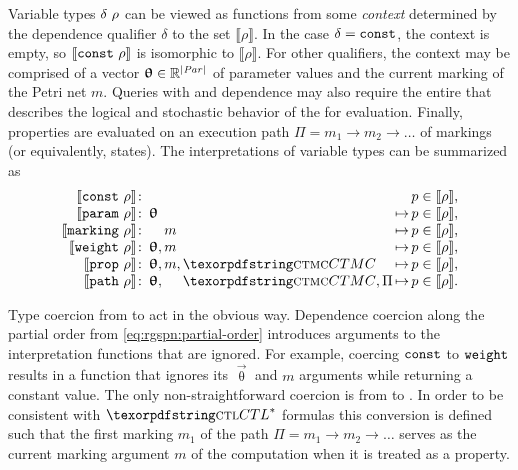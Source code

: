 Variable types \(\delta\ \rho\) can be viewed as functions from some \emph{context} determined by the dependence qualifier \(\delta\) to the set \(\llbracket \rho \rrbracket\). In the case \(\delta = \texttt{\upshape const}\), the context is empty, so \(\llbracket \texttt{\upshape const}\ \rho \rrbracket\) is isomorphic to \(\llbracket \rho \rrbracket\). For other qualifiers, the context may be comprised of a vector \(\bm{\mathrm{\uptheta}} \in \mathbb{R}^{\lvert \textrm{\itshape Par\/} \rvert}\) of parameter values and the current marking of the Petri net \(m\). Queries with  and  dependence may also require the entire  that describes the logical and stochastic behavior of the  for evaluation. Finally,  properties are evaluated on an execution path \(\Pi = m_1 \to m_2 \to \ldots\) of markings (or equivalently,  states). The interpretations of variable types can be summarized as
\begin{equation}
  \begin{array}{@{}r@{\,}l@{\,}l@{\,}l@{\,}l@{\,}l@{\,}c@{}}
    \llbracket \vartype{\lit{const}}{\rho} \rrbracket \colon& & & & & &p \in \llbracket \rho \rrbracket \text, \\
    \llbracket \vartype{\lit{param}}{\rho} \rrbracket \colon& \vec{\uptheta} & & & & \mapsto &p \in \llbracket \rho \rrbracket \text, \\
    \llbracket \vartype{\lit{marking}}{\rho} \rrbracket \colon& & m & & & \mapsto &p \in \llbracket \rho \rrbracket \text, \\
    \llbracket \vartype{\lit{weight}}{\rho} \rrbracket \colon& \vec{\uptheta}, & m & & & \mapsto &p \in \llbracket \rho \rrbracket \text, \\
    \llbracket \vartype{\lit{prop}}{\rho} \rrbracket \colon& \vec{\uptheta}, & m, & \textabbr{CTMC} & & \mapsto &p \in \llbracket \rho \rrbracket \text, \\
    \llbracket \vartype{\lit{path}}{\rho} \rrbracket \colon& \vec{\uptheta}, & & \textabbr{CTMC}, & \Pi & \mapsto &p \in \llbracket \rho \rrbracket \text. \\
  \end{array}
\end{equation}

Type coercion from  to  act in the obvious way. Dependence coercion along the partial order from \vref{eq:rgspn:partial-order} introduces arguments to the interpretation functions that are ignored. For example, coercing \(\texttt{\upshape const}\) to \(\texttt{\upshape weight}\) results in a function that ignores its \(\vec{\uptheta}\) and \(m\) arguments while returning a constant value. The only non-straightforward coercion is from  to . In order to be consistent with \(\textabbr{CTL}^*\) formulas this conversion is defined such that the first marking \(m_1\) of the path \(\Pi = m_1 \to m_2 \to \ldots\) serves as the current marking argument \(m\) of the  computation when it is treated as a  property.

